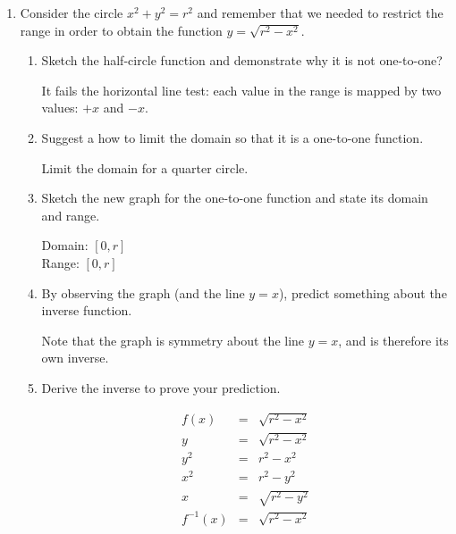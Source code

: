 \documentclass[letterpaper,12pt,fleqn]{article}
\begin{document}
\begin{enumerate}
\item Consider the circle $x^2+y^2=r^2$ and remember that we needed to restrict
the range in order to obtain the function $y=\sqrt{r^2-x^2}$.
\begin{enumerate}
\item Sketch the half-circle function and demonstrate why it is not one-to-one?


It fails the horizontal line test: each value in the range is mapped by two
values: $+x$ and $-x$.

\bigskip

\item Suggest a how to limit the domain so that it is a one-to-one function.

\bigskip

Limit the domain for a quarter circle.

\bigskip

\item Sketch the new graph for the one-to-one function and state its domain and
range.


Domain: $[0,r]$ \\
Range: $[0,r]$

\bigskip


\item By observing the graph (and the line $y=x$), predict something about the
inverse function.

\bigskip

Note that the graph is symmetry about the line $y=x$, and is therefore its
own inverse.

\bigskip

\item Derive the inverse to prove your prediction.

\begin{eqnarray*}
f(x) &=& \sqrt{r^2-x^2} \\
y &=& \sqrt{r^2-x^2} \\
y^2 &=& r^2-x^2 \\
x^2 &=& r^2-y^2 \\
x &=& \sqrt{r^2-y^2} \\
f^{-1}(x) &=& \sqrt{r^2-x^2}
\end{eqnarray*}


\end{enumerate}
\end{enumerate}
\end{document}
